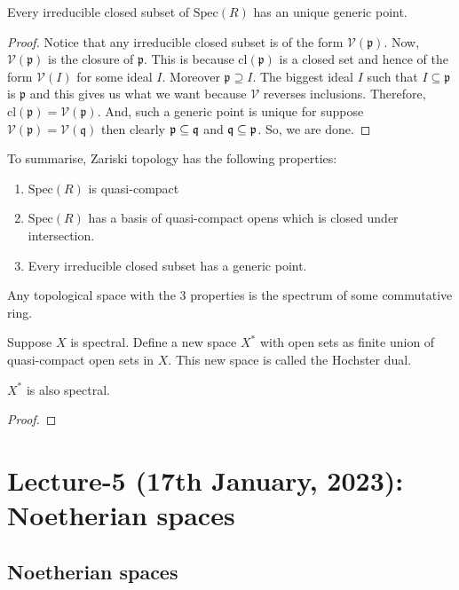 \documentclass[oneside, 12pt, ]{scrbook}
\newcommand{\V}{\mathcal{V}}
\newcommand{\spec}{\mathrm{Spec}}
\newcommand{\pr}{\mathfrak{p}}
\theoremstyle{theorem}
\begin{document}
\begin{proposition}
Every irreducible closed subset of $\spec(R)$ has an unique generic point.
\end{proposition}

\begin{proof}
Notice that any irreducible closed subset is of the form $\V(\pr)$. Now, $\V(\pr)$ is the closure of $\pr$. This is because $\mathrm{cl}(\pr)$ is a closed set and hence of the form $\V(I)$ for some ideal $I$. Moreover $\pr \supseteq I$. The biggest ideal $I$ such that $I \subseteq \pr$ is $\pr$ and this gives us what we want because $\V$ reverses inclusions. Therefore, $\mathrm{cl}(\pr) = \V(\pr)$. And, such a generic point is unique for suppose $\V(\pr) = \V(\mathfrak{q})$ then clearly $\pr \subseteq \frak{q}$ and $\frak{q} \subseteq \pr$. So, we are done. 
\end{proof}

To summarise, Zariski topology has the following properties: 
\begin{enumerate}
\item $\spec(R)$ is quasi-compact
\item $\spec(R)$ has a basis of quasi-compact opens which is closed under intersection.
\item Every irreducible closed subset has a generic point.
\end{enumerate}

\begin{theorem}[Hochster]
Any topological space with the $3$ properties is the spectrum of some commutative ring.
\end{theorem}



Suppose $X$ is spectral. Define a new space $X^{*}$ with open sets as finite union of quasi-compact open sets in $X$. This new space is called the Hochster dual.

\begin{theorem}
$X^{*}$ is also spectral.
\end{theorem} 

\begin{proof}

\end{proof}


\chapter{Lecture-5 (17th January, 2023): Noetherian spaces}

\section{Noetherian spaces}
\end{document}
